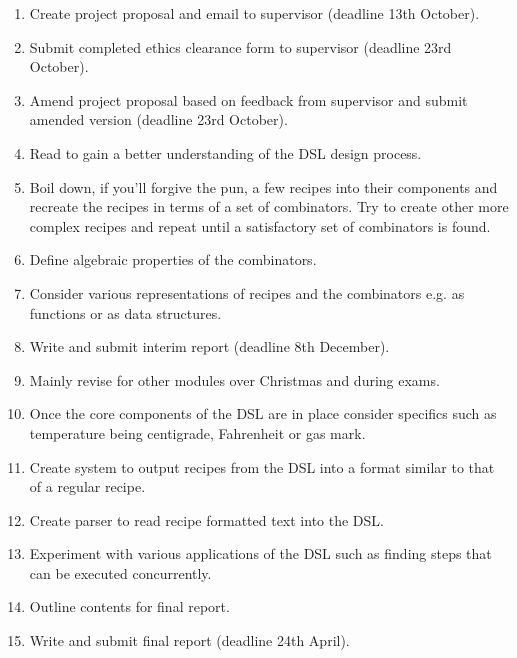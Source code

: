 \documentclass[11pt]{article}
\begin{document}
    \begin{enumerate}
        
        \item Create project proposal and email to supervisor
        (deadline 13th October).

        \item Submit completed ethics clearance form to supervisor
        (deadline 23rd October).

        \item Amend project proposal based on feedback from
        supervisor and submit amended version (deadline 23rd October).

        \item Read \cite{hudak, contracts, pretty} to gain a better
        understanding of the DSL design process.

        \item Boil down, if you'll forgive the pun, a few recipes
        into their components and recreate the recipes in terms
        of a set of combinators. Try to create other more complex
        recipes and repeat until a satisfactory set of combinators
        is found.

        \item Define algebraic properties of the combinators.

        \item Consider various representations of recipes and the
        combinators e.g. as functions or as data structures.

        \item Write and submit interim report (deadline 8th December).

        \item Mainly revise for other modules over Christmas and during
        exams.

        \item Once the core components of the DSL are in place
        consider specifics such as temperature being centigrade,
        Fahrenheit or gas mark.

        \item Create system to output recipes from the DSL into a format
        similar to that of a regular recipe.

        \item Create parser to read recipe formatted text into the DSL.

        \item Experiment with various applications of the DSL such
        as finding steps that can be executed concurrently.

        \item Outline contents for final report.

        \item Write and submit final report (deadline 24th April).

    \end{enumerate}
\end{document}
